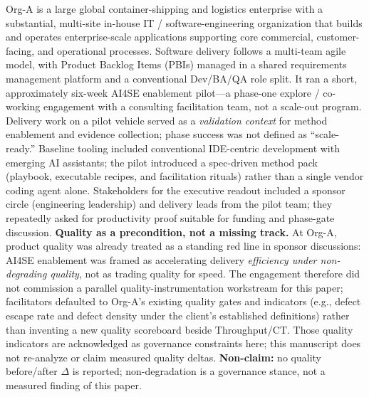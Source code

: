 \documentclass[10pt,conference]{IEEEtran}
\begin{document}
Org-A is a large global container-shipping and logistics enterprise with a substantial, multi-site in-house IT / software-engineering organization that builds and operates enterprise-scale applications supporting core commercial, customer-facing, and operational processes.
Software delivery follows a multi-team agile model, with Product Backlog Items (PBIs) managed in a shared requirements management platform and a conventional Dev/BA/QA role split.
It ran a short, approximately six-week AI4SE enablement pilot---a phase-one explore / co-working engagement with a consulting facilitation team, not a scale-out program.
Delivery work on a pilot vehicle served as a \emph{validation context} for method enablement and evidence collection; phase success was not defined as ``scale-ready.''
Baseline tooling included conventional IDE-centric development with emerging AI assistants; the pilot introduced a spec-driven method pack (playbook, executable recipes, and facilitation rituals) rather than a single vendor coding agent alone.
Stakeholders for the executive readout included a sponsor circle (engineering leadership) and delivery leads from the pilot team; they repeatedly asked for productivity proof suitable for funding and phase-gate discussion.
\textbf{Quality as a precondition, not a missing track.}
At Org-A, product quality was already treated as a standing red line in sponsor discussions: AI4SE enablement was framed as accelerating delivery \emph{efficiency under non-degrading quality}, not as trading quality for speed.
The engagement therefore did not commission a parallel quality-instrumentation workstream for this paper; facilitators defaulted to Org-A's existing quality gates and indicators (e.g., defect escape rate and defect density under the client's established definitions) rather than inventing a new quality scoreboard beside Throughput/CT.
Those quality indicators are acknowledged as governance constraints here; this manuscript does not re-analyze or claim measured quality deltas.
\textbf{Non-claim:} no quality before/after $\Delta$ is reported; non-degradation is a governance stance, not a measured finding of this paper.
\end{document}
